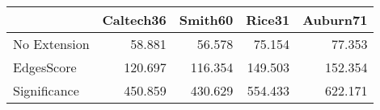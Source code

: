 \begin{tabular}{lrrrr}
\toprule
{} & Caltech36 & Smith60 &  Rice31 & Auburn71 \\
\midrule
No Extension &    58.881 &  56.578 &  75.154 &   77.353 \\
EdgesScore   &   120.697 & 116.354 & 149.503 &  152.354 \\
Significance &   450.859 & 430.629 & 554.433 &  622.171 \\
\bottomrule
\end{tabular}
